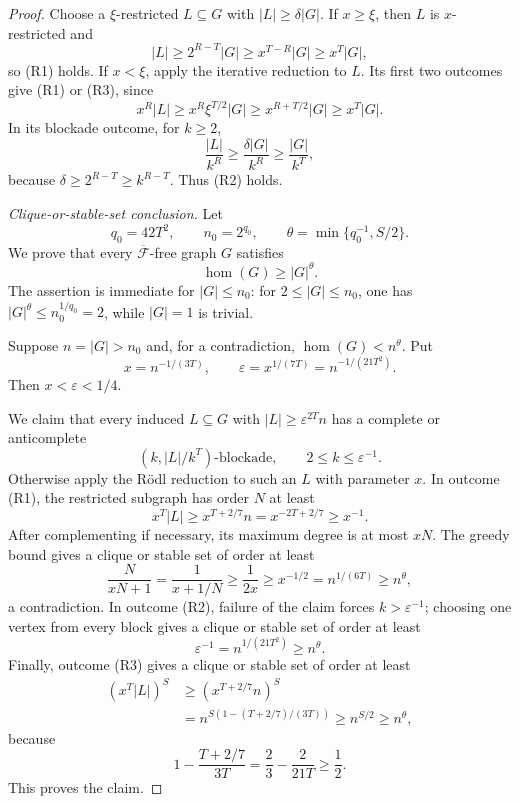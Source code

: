 \documentclass[11pt]{article}
\numberwithin{equation}{section}
\theoremstyle{plain}
\theoremstyle{definition}
\begin{document}
\begin{proof}
Choose a $\xi$-restricted $L\subseteq G$ with
$|L|\geq\delta|G|$.  If $x\geq\xi$, then $L$ is $x$-restricted and
\[
 |L|\geq2^{R-T}|G|
      \geq x^{T-R}|G|
      \geq x^T|G|,
\]
so (R1) holds.  If $x<\xi$, apply the iterative reduction to $L$.
Its first two outcomes give (R1) or (R3), since
\[
 x^R|L|\geq x^R\xi^{T/2}|G|
          \geq x^{R+T/2}|G|
          \geq x^T|G|.
\]
In its blockade outcome, for $k\geq2$,
\[
 \frac{|L|}{k^R}
     \geq\frac{\delta|G|}{k^R}
     \geq\frac{|G|}{k^T},
\]
because $\delta\geq2^{R-T}\geq k^{R-T}$.  Thus (R2) holds.

\medskip
\noindent\emph{Clique-or-stable-set conclusion.}
Let
\[
 q_0=42T^2,\qquad n_0=2^{q_0},\qquad
 \theta=\min\{q_0^{-1},S/2\}.
\]
We prove that every $\overline{\mathcal F}$-free graph $G$ satisfies
\[
                       \operatorname{hom}(G)\geq |G|^\theta.
\]
The assertion is immediate for $|G|\leq n_0$: for
$2\leq|G|\leq n_0$, one has
$|G|^\theta\leq n_0^{1/q_0}=2$, while $|G|=1$ is trivial.

Suppose $n=|G|>n_0$ and, for a contradiction,
$\operatorname{hom}(G)<n^\theta$.  Put
\[
       x=n^{-1/(3T)},\qquad
       \varepsilon=x^{1/(7T)}
                  =n^{-1/(21T^2)}.
\]
Then $x<\varepsilon<1/4$.

We claim that every induced $L\subseteq G$ with
$|L|\geq\varepsilon^{2T}n$ has a complete or anticomplete
\[
             (k,|L|/k^T)\text{-blockade},
             \qquad 2\leq k\leq\varepsilon^{-1}.
\]
Otherwise apply the R\"odl reduction to such an $L$ with parameter
$x$.  In outcome (R1), the restricted subgraph has order $N$ at least
\[
 x^T|L|
   \geq x^{T+2/7}n
   =x^{-2T+2/7}
   \geq x^{-1}.
\]
After complementing if necessary, its maximum degree is at most $xN$.
The greedy bound gives a clique or stable set of order at least
\[
 \frac{N}{xN+1}
   =\frac1{x+1/N}
   \geq\frac1{2x}
   \geq x^{-1/2}
   =n^{1/(6T)}
   \geq n^\theta,
\]
a contradiction.  In outcome (R2), failure of the claim forces
$k>\varepsilon^{-1}$; choosing one vertex from every block gives a
clique or stable set of order at least
\[
 \varepsilon^{-1}
       =n^{1/(21T^2)}
       \geq n^\theta.
\]
Finally, outcome (R3) gives a clique or stable set of order at least
\[
 \begin{split}
 (x^T|L|)^S
  &\geq(x^{T+2/7}n)^S\\
  &=n^{S(1-(T+2/7)/(3T))}
   \geq n^{S/2}
   \geq n^\theta,
 \end{split}
\]
because
\[
 1-\frac{T+2/7}{3T}
       =\frac23-\frac{2}{21T}\geq\frac12.
\]
This proves the claim.


\end{proof}
\end{document}
